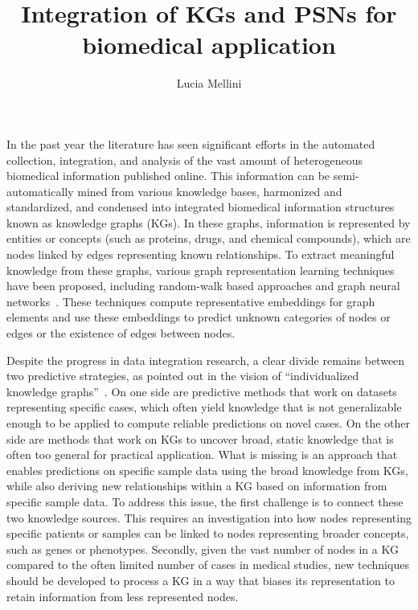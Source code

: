 \documentclass[12pt]{article}
\title{Integration of KGs and PSNs for biomedical application}
\author{Lucia Mellini}
\date{}
\begin{document}
\maketitle

In the past year the literature has seen significant efforts in the automated collection, integration, and analysis of the vast amount of heterogeneous biomedical information published online. This information can be semi-automatically mined from various knowledge bases, harmonized and standardized, and condensed into integrated biomedical information structures known as knowledge graphs (KGs). In these graphs, information is represented by entities or concepts (such as proteins, drugs, and chemical compounds), which are nodes linked by edges representing known relationships.
To extract meaningful knowledge from these graphs, various graph representation learning techniques have been proposed, including random-walk based approaches and graph neural networks~\cite{Hamilton2020GraphRL}. These techniques compute representative embeddings for graph elements and use these embeddings to predict unknown categories of nodes or edges or the existence of edges between nodes.

Despite the progress in data integration research, a clear divide remains between two predictive strategies, as pointed out in the vision of ``individualized knowledge graphs''~\cite{PingPeipei2017IKGA}. On one side are predictive methods that work on datasets representing specific cases, which often yield knowledge that is not generalizable enough to be applied to compute reliable predictions on novel cases. On the other side are methods that work on KGs to uncover broad, static knowledge that is often too general for practical application. What is missing is an approach that enables predictions on specific sample data using the broad knowledge from KGs, while also deriving new relationships within a KG based on information from specific sample data. To address this issue, the first challenge is to connect these two knowledge sources. This requires an investigation into how nodes representing specific patients or samples can be linked to nodes representing broader concepts, such as genes or phenotypes. Secondly, given the vast number of nodes in a KG compared to the often limited number of cases in medical studies, new techniques should be developed to process a KG in a way that biases its representation to retain information from less represented nodes.
\end{document}
